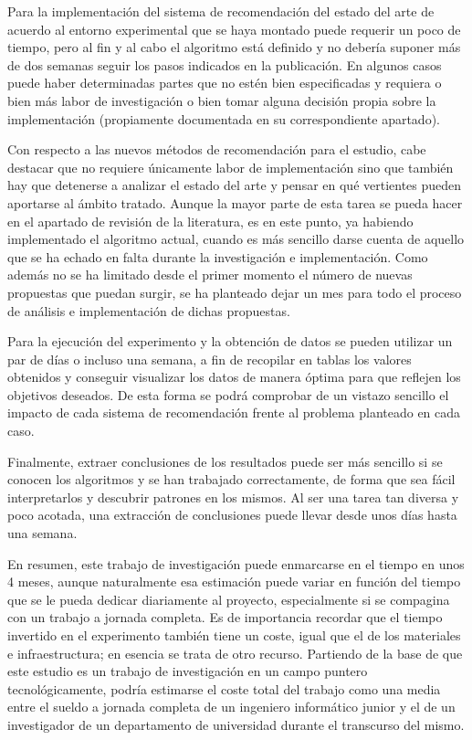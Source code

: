 Para la implementación del sistema de recomendación del estado del arte de acuerdo al entorno experimental que se haya montado puede requerir un poco de tiempo, pero al fin y al cabo el algoritmo está definido y no debería suponer más de dos semanas seguir los pasos indicados en la publicación. En algunos casos puede haber determinadas partes que no estén bien especificadas y requiera o bien más labor de investigación o bien tomar alguna decisión propia sobre la implementación (propiamente documentada en su correspondiente apartado).

Con respecto a las nuevos métodos de recomendación para el estudio, cabe destacar que no requiere únicamente labor de implementación sino que también hay que detenerse a analizar el estado del arte y pensar en qué vertientes pueden aportarse al ámbito tratado. Aunque la mayor parte de esta tarea se pueda hacer en el apartado de revisión de la literatura, es en este punto, ya habiendo implementado el algoritmo actual, cuando es más sencillo darse cuenta de aquello que se ha echado en falta durante la investigación e implementación. Como además no se ha limitado desde el primer momento el número de nuevas propuestas que puedan surgir, se ha planteado dejar un mes para todo el proceso de análisis e implementación de dichas propuestas.

Para la ejecución del experimento y la obtención de datos se pueden utilizar un par de días o incluso una semana, a fin de recopilar en tablas los valores obtenidos y conseguir visualizar los datos de manera óptima para que reflejen los objetivos deseados. De esta forma se podrá comprobar de un vistazo sencillo el impacto de cada sistema de recomendación frente al problema planteado en cada caso.

Finalmente, extraer conclusiones de los resultados puede ser más sencillo si se conocen los algoritmos y se han trabajado correctamente, de forma que sea fácil interpretarlos y descubrir patrones en los mismos. Al ser una tarea tan diversa y poco acotada, una extracción de conclusiones puede llevar desde unos días hasta una semana.

En resumen, este trabajo de investigación puede enmarcarse en el tiempo en unos 4 meses, aunque naturalmente esa estimación puede variar en función del tiempo que se le pueda dedicar diariamente al proyecto, especialmente si se compagina con un trabajo a jornada completa. Es de importancia recordar que el tiempo invertido en el experimento también tiene un coste, igual que el de los materiales e infraestructura; en esencia se trata de otro recurso. Partiendo de la base de que este estudio es un trabajo de investigación en un campo puntero tecnológicamente, podría estimarse el coste total del trabajo como una media entre el sueldo a jornada completa de un ingeniero informático junior y el de un investigador de un departamento de universidad durante el transcurso del mismo.

